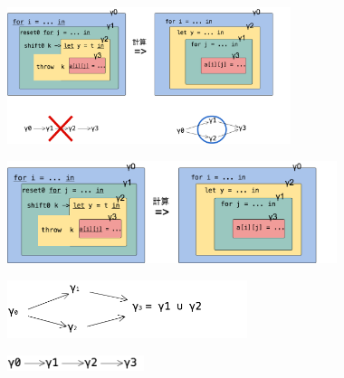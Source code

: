 \begin{center}
  \includegraphics[clip,height=4cm]{./img/ecex_for.png}
\end{center}

\begin{center}
  \includegraphics[clip,height=3cm]{./img/ecex_for_non_gamma.png}
\end{center}

\begin{center}
  \includegraphics[clip,width=7cm]{./img/gamma.png}
\end{center}

\begin{center}
  \includegraphics[clip,width=4cm]{./img/gamma_normal.png}
\end{center}

